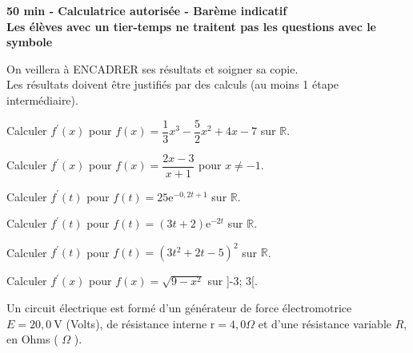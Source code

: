 \documentclass[11pt,a4paper]{article}  %
\begin{document}
	\graphicspath{{images/}}

	\begin{center}

	\end{center}
	\begin{center}\textbf{50 min - Calculatrice autorisée - Barème indicatif}\\
		\textbf{Les élèves avec un tier-temps ne traitent pas les questions avec  le symbole }
	\end{center}

	\begin{center}
		On veillera à ENCADRER ses résultats et soigner sa copie.\\
		Les résultats doivent être justifiés par des calculs (au moins 1 étape intermédiaire).
	\end{center}


\begin{enumMet}
	\item Calculer $f^{\prime}(x)$ pour $f(x)=\dfrac{1}{3} x^3-\dfrac{5}{2} x^2+4 x-7$ sur $\mathbb{R}$.
	\item Calculer $f^{\prime}(x)$ pour $f(x)=\dfrac{2x-3}{x+1}$ pour $x \neq -1$.
	\item Calculer $f^{\prime}(t)$ pour $f(t)=25 \mathrm{e}^{-0,2 t+1}$ sur $\mathbb{R}$.
	\item Calculer $f^{\prime}(t)$ pour $f(t)=(3 t+2) \mathrm{e}^{-2t}$ sur $\mathbb{R}$.
	\item Calculer $f^{\prime}(t)$ pour $f(t)=\left(3 t^2+2 t-5\right)^2$ sur $\mathbb{R}$.
	\item Calculer $f^{\prime}(x)$ pour $f(x)=\sqrt{9-x^2}$ sur ]-3; 3[.
\end{enumMet}


Un circuit électrique est formé d'un générateur de force électromotrice $E=20,0 \mathrm{~V}$ (Volts), de résistance interne $\mathrm{r}=4,0 \Omega$ et d'une résistance variable $R$, en Ohms ( $\Omega$ ).
\end{document}
